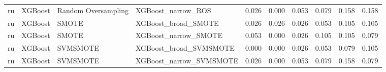\begin{tabular}{llllllllll}
      ru &                      XGBoost & Random Oversampling &                           XGBoost\_narrow\_ROS & 0.026 &                     0.000 &                 0.053 &                  0.079 &                                   0.158 &     0.158 \\
      ru &                      XGBoost &               SMOTE &                          XGBoost\_broad\_SMOTE & 0.026 &                     0.026 &                 0.026 &                  0.053 &                                   0.105 &     0.105 \\
      ru &                      XGBoost &               SMOTE &                         XGBoost\_narrow\_SMOTE & 0.053 &                     0.000 &                 0.026 &                  0.105 &                                   0.105 &     0.079 \\
      ru &                      XGBoost &            SVMSMOTE &                       XGBoost\_broad\_SVMSMOTE & 0.000 &                     0.000 &                 0.026 &                  0.053 &                                   0.079 &     0.105 \\
      ru &                      XGBoost &            SVMSMOTE &                      XGBoost\_narrow\_SVMSMOTE & 0.026 &                     0.000 &                 0.053 &                  0.079 &                                   0.158 &     0.079 \\
\bottomrule
\end{tabular}
